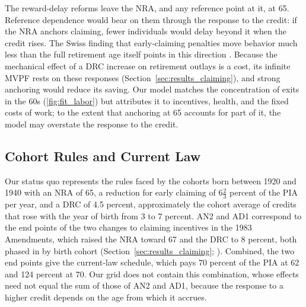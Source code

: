 The reward-delay reforms leave the NRA, and any reference point at it, at 65. Reference dependence would bear on them through the response to the credit: if the NRA anchors claiming, fewer individuals would delay beyond it when the credit rises. The Swiss finding that early-claiming penalties move behavior much less than the full retirement age itself points in this direction \citep{Lalive2023how}. Because the mechanical effect of a DRC increase on retirement outlays is a cost, its infinite MVPF rests on these responses (Section~\ref{sec:results_claiming}), and strong anchoring would reduce its saving. Our model matches the concentration of exits in the 60s (\autoref{fig:fit_labor}) but attributes it to incentives, health, and the fixed costs of work; to the extent that anchoring at 65 accounts for part of it, the model may overstate the response to the credit.

\subsection{Cohort Rules and Current Law}\label{sec:disc_cohort}

Our status quo represents the rules faced by the cohorts born between 1920 and 1940 with an NRA of 65, a reduction for early claiming of $6\tfrac{2}{3}$ percent of the PIA per year, and a DRC of 4.5 percent, approximately the cohort average of credits that rose with the year of birth from 3 to 7 percent. AN2 and AD1 correspond to the end points of the two changes to claiming incentives in the 1983 Amendments, which raised the NRA toward 67 and the DRC to 8 percent, both phased in by birth cohort (Section~\ref{sec:results_claiming}; \citealp{Svahn1983social}). Combined, the two end points give the current-law schedule, which pays 70 percent of the PIA at 62 and 124 percent at 70. %
Our grid does not contain this combination, whose effects need not equal the sum of those of AN2 and AD1, because the response to a higher credit depends on the age from which it accrues.

